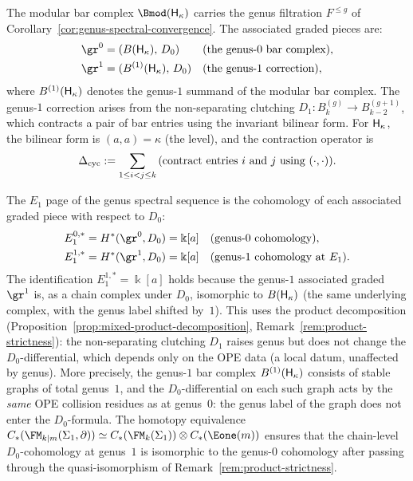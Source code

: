 \begin{computation}
\label{comp:heis-genus-filtration}
The modular bar complex $\Bmod(\Heis_\kappa)$ carries the genus
filtration $F^{\le g}$ of
Corollary~\ref{cor:genus-spectral-convergence}. The
associated graded pieces are:
\begin{align*}
 \gr^0 &= (B(\Heis_\kappa),\, D_0)
 &&\text{(the genus-$0$ bar complex)}, \\
 \gr^1 &= (B^{(1)}(\Heis_\kappa),\, D_0)
 &&\text{(the genus-$1$ correction)},
\end{align*}
where $B^{(1)}(\mathsf{H}_\kappa)$ denotes the genus-$1$ summand
of the modular bar complex. The genus-$1$ correction arises
from the non-separating clutching
$D_1 \colon B_k^{(g)} \to B_{k-2}^{(g+1)}$,
which contracts a pair of bar entries using the invariant
bilinear form. For $\mathsf{H}_\kappa$, the bilinear form is
$(a, a) = \kappa$ (the level), and the contraction operator is
\[
 \Delta_{\mathrm{cyc}} :=
 \sum_{1 \le i < j \le k}
 \text{(contract entries $i$ and $j$ using $({\cdot},{\cdot})$)}.
\]

The $E_1$ page of the genus spectral sequence is the
cohomology of each associated graded piece with respect
to $D_0$:
\begin{equation}\label{eq:heis-E1-page}
\begin{aligned}
 E_1^{0,\ast}
 &= H^\ast(\gr^0, D_0) = \Bbbk[a]
 &&\text{(genus-$0$ cohomology)}, \\
 E_1^{1,\ast}
 &= H^\ast(\gr^1, D_0) = \Bbbk[a]
 &&\text{(genus-$1$ cohomology at $E_1$)}.
\end{aligned}
\end{equation}
The identification $E_1^{1,\ast} = \Bbbk[a]$ holds because
the genus-$1$ associated graded $\gr^1$ is, as a chain complex
under $D_0$, isomorphic to $B(\mathsf{H}_\kappa)$ (the same
underlying complex, with the genus label shifted by~$1$).
This uses the product decomposition
(Proposition~\ref{prop:mixed-product-decomposition},
Remark~\ref{rem:product-strictness}): the
non-separating clutching $D_1$ raises genus but does not change
the $D_0$-differential, which depends only on the OPE data
(a local datum, unaffected by genus). More precisely, the
genus-$1$ bar complex $B^{(1)}(\mathsf{H}_\kappa)$ consists of
stable graphs of total genus~$1$, and the $D_0$-differential
on each such graph acts by the \emph{same} OPE collision
residues as at genus~$0$: the genus label of the graph
does not enter the $D_0$-formula. The homotopy equivalence
$C_\ast(\FM_{k|m}(\Sigma_1, \partial)) \simeq
C_\ast(\FM_k(\Sigma_1)) \otimes C_\ast(\Eone(m))$
ensures that the chain-level $D_0$-cohomology at genus~$1$
is isomorphic to the genus-$0$ cohomology after passing
through the quasi-isomorphism of
Remark~\ref{rem:product-strictness}.
\end{computation}

